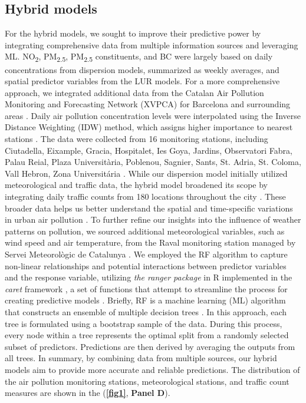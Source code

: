 \documentclass{article}
\begin{document}
\subsection{Hybrid models}
For the hybrid models, we sought to improve their predictive power by integrating comprehensive data from multiple information sources and leveraging ML. NO\textsubscript{2}, PM\textsubscript{2.5}, PM\textsubscript{2.5} constituents, and BC were largely based on daily concentrations from dispersion models, summarized as weekly averages, and spatial predictor variables from the LUR models. For a more comprehensive approach, we integrated additional data from the Catalan Air Pollution Monitoring and Forecasting Network (XVPCA) for Barcelona and surrounding areas \cite{xarxa2012}. Daily air pollution concentration levels were interpolated using the Inverse Distance Weighting (IDW) method, which assigns higher importance to nearest stations \cite{hoek2017}. The data were collected from 16 monitoring stations, including Ciutadella, Eixample, Gracia, Hospitalet, Ies Goya, Jardins, Observatori Fabra, Palau Reial, Plaza Universitària, Poblenou, Sagnier, Sants, St. Adria, St. Coloma, Vall Hebron, Zona Universitária \cite{xarxa2012}. While our dispersion model initially utilized meteorological and traffic data, the hybrid model broadened its scope by integrating daily traffic counts from 180 locations throughout the city \cite{trafficbcn}. These broader data helps us better understand the spatial and time-specific variations in urban air pollution \cite{pinto2020}. To further refine our insights into the influence of weather patterns on pollution, we sourced additional meteorological variables, such as wind speed and air temperature, from the Raval monitoring station managed by Servei Meteorològic de Catalunya \cite{xema2013}. We employed the RF algorithm to capture non-linear relationships and potential interactions between predictor variables and the response variable, utilizing \textit{the ranger package} in R implemented in the \textit{caret} framework \cite{wright2019}, a set of functions that attempt to streamline the process for creating predictive models \cite{caret2008}. Briefly, RF is a machine learning (ML) algorithm that constructs an ensemble of multiple decision trees \cite{breiman2001}. In this approach, each tree is formulated using a bootstrap sample of the data. During this process, every node within a tree represents the optimal split from a randomly selected subset of predictors. Predictions are then derived by averaging the outputs from all trees. In summary, by combining data from multiple sources, our hybrid models aim to provide more accurate and reliable predictions. The distribution of the air pollution monitoring stations, meteorological stations, and traffic count measures are shown in the (\textbf{\cref{fig1}}, \textbf{Panel D}). 
\end{document}

